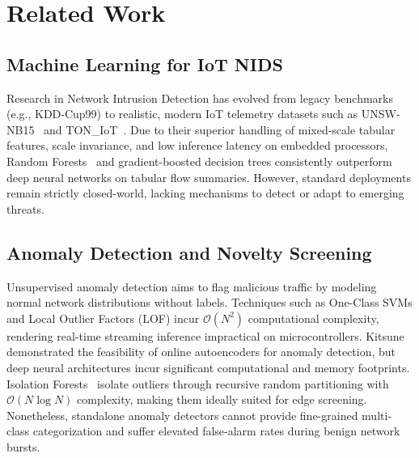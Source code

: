 \documentclass[conference]{IEEEtran}
\begin{document}
\section{Related Work}
\label{sec:related_work}

\subsection{Machine Learning for IoT NIDS}
Research in Network Intrusion Detection has evolved from legacy benchmarks (e.g., KDD-Cup99) to realistic, modern IoT telemetry datasets such as UNSW-NB15~\cite{moustafa2015unsw} and TON\_IoT~\cite{alshammari2020toniot}. Due to their superior handling of mixed-scale tabular features, scale invariance, and low inference latency on embedded processors, Random Forests~\cite{breiman2001random} and gradient-boosted decision trees consistently outperform deep neural networks on tabular flow summaries. However, standard deployments remain strictly closed-world, lacking mechanisms to detect or adapt to emerging threats.

\subsection{Anomaly Detection and Novelty Screening}
Unsupervised anomaly detection aims to flag malicious traffic by modeling normal network distributions without labels. Techniques such as One-Class SVMs and Local Outlier Factors (LOF) incur $\mathcal{O}(N^2)$ computational complexity, rendering real-time streaming inference impractical on microcontrollers. Kitsune~\cite{mirsky2018kitsune} demonstrated the feasibility of online autoencoders for anomaly detection, but deep neural architectures incur significant computational and memory footprints. Isolation Forests~\cite{liu2008isolation} isolate outliers through recursive random partitioning with $\mathcal{O}(N \log N)$ complexity, making them ideally suited for edge screening. Nonetheless, standalone anomaly detectors cannot provide fine-grained multi-class categorization and suffer elevated false-alarm rates during benign network bursts.
\end{document}
